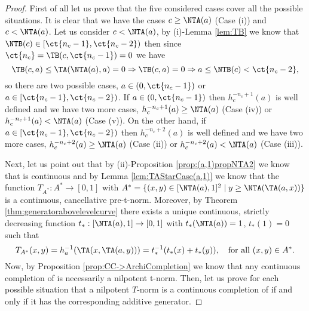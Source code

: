 \begin{proof} First of all let us prove that the five considered cases cover all the possible situations. It is clear that we have the cases $c \geq \NTA(a)$ (Case (i)) and $c< \NTA(a)$. Let us consider $c< \NTA(a)$, by (i)-Lemma \ref{lem:TB} we know that $\NTB(c) \in [\ct{n_c-1},\ct{n_c-2})$ then since $\ct{n_c}=\TB(c,\ct{n_c-1})=0$ we have
	$$\TB(c,a) \leq \TA(\NTA(a),a)=0 \Rightarrow \TB(c,a)=0 \Rightarrow a \leq \NTB(c)<\ct{n_c-2},$$
	so there are two possible cases, $a \in (0,\ct{n_c-1})$ or $a \in [\ct{n_c-1},\ct{n_c-2})$. If $a \in (0,\ct{n_c-1})$ then $h_c^{-n_c+1}(a)$ is well defined and we have two more cases, $h_c^{-n_c+1}(a) \geq \NTA(a)$ (Case (iv)) or $h_c^{-n_c+1}(a)<\NTA(a)$ (Case (v)). On the other hand, if $a \in [\ct{n_c-1},\ct{n_c-2})$ then $h_c^{-n_c+2}(a)$ is well defined and we have two more cases, $h_c^{-n_c+2}(a) \geq \NTA(a)$ (Case (ii)) or $h_c^{-n_c+2}(a)<\NTA(a)$ (Case (iii)).
	
	Next, let us point out that by (ii)-Proposition \ref{prop:(a,1)propNTA2} we know that \NTA is continuous and by Lemma \ref{lem:TAStarCase(a,1)} we know that the function $T_{A^*}: A^* \to [0,1]$ with $A^* = \{(x,y) \in [\NTA(a),1]^2 \mid y \geq \NTA(\TA(a,x))\}$ is a continuous, cancellative pre-t-norm. Moreover, by Theorem \ref{thm:generatorabovelevelcurve} there exists a unique continuous, strictly decreasing function $t_{*} : [\NTA(a),1] \to [0,1]$ with $t_*(\NTA(a))=1$, $t_*(1)=0$ such that
	$$T_{A^*}(x,y)=h_a^{-1}(\TA(x,\TA(a,y))) = t_*^{-1}(t_*(x)+t_*(y)), \quad \text{for all } (x,y) \in A^*.$$
	Now, by Proposition \ref{prop:CC->ArchiCompletion} we know that any continuous completion of \TB is necessarily a nilpotent t-norm. Then, let us prove for each possible situation that a nilpotent $T$-norm is a continuous completion of \TA if and only if it has the corresponding additive generator.
	

\end{proof}
